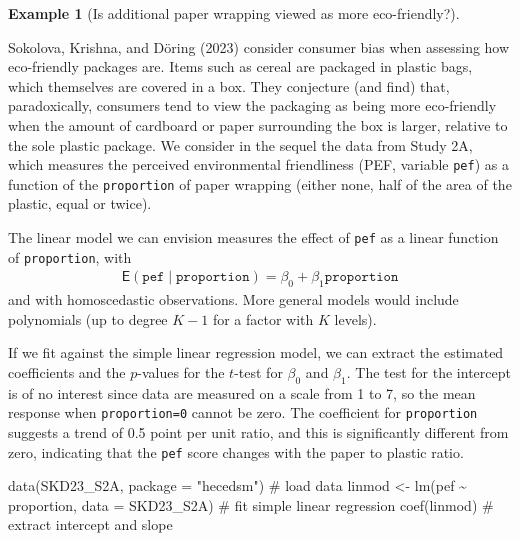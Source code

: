 \documentclass[
  11pt,
  letterpaper,
]{scrbook}
\newenvironment{Shaded}{\begin{snugshade}}{\end{snugshade}}
\newcommand{\AttributeTok}[1]{\textcolor[rgb]{0.40,0.45,0.13}{#1}}
\newcommand{\CommentTok}[1]{\textcolor[rgb]{0.37,0.37,0.37}{#1}}
\newcommand{\FunctionTok}[1]{\textcolor[rgb]{0.28,0.35,0.67}{#1}}
\newcommand{\NormalTok}[1]{\textcolor[rgb]{0.00,0.23,0.31}{#1}}
\newcommand{\OtherTok}[1]{\textcolor[rgb]{0.00,0.23,0.31}{#1}}
\newcommand{\SpecialCharTok}[1]{\textcolor[rgb]{0.37,0.37,0.37}{#1}}
\newcommand{\StringTok}[1]{\textcolor[rgb]{0.13,0.47,0.30}{#1}}
\theoremstyle{definition}
\newtheorem{example}{Example}[chapter]
\theoremstyle{definition}
\theoremstyle{remark}
\begin{document}
\begin{example}[Is additional paper wrapping viewed as more
eco-friendly?]\protect\hypertarget{exm-sokolova}{}\label{exm-sokolova}

Sokolova, Krishna, and Döring (2023) consider consumer bias when
assessing how eco-friendly packages are. Items such as cereal are
packaged in plastic bags, which themselves are covered in a box. They
conjecture (and find) that, paradoxically, consumers tend to view the
packaging as being more eco-friendly when the amount of cardboard or
paper surrounding the box is larger, relative to the sole plastic
package. We consider in the sequel the data from Study 2A, which
measures the perceived environmental friendliness (PEF, variable
\texttt{pef}) as a function of the \texttt{proportion} of paper wrapping
(either none, half of the area of the plastic, equal or twice).

The linear model we can envision measures the effect of \texttt{pef} as
a linear function of \texttt{proportion}, with \begin{align*}
\mathsf{E}(\texttt{pef} \mid \texttt{proportion}) = \beta_0 + \beta_1 \texttt{proportion}
\end{align*} and with homoscedastic observations. More general models
would include polynomials (up to degree \(K-1\) for a factor with \(K\)
levels).

If we fit against the simple linear regression model, we can extract the
estimated coefficients and the \(p\)-values for the \(t\)-test for
\(\beta_0\) and \(\beta_1\). The test for the intercept is of no
interest since data are measured on a scale from 1 to 7, so the mean
response when \texttt{proportion=0} cannot be zero. The coefficient for
\texttt{proportion} suggests a trend of 0.5 point per unit ratio, and
this is significantly different from zero, indicating that the
\texttt{pef} score changes with the paper to plastic ratio.

\begin{Shaded}
\begin{Highlighting}[]
\FunctionTok{data}\NormalTok{(SKD23\_S2A, }\AttributeTok{package =} \StringTok{"hecedsm"}\NormalTok{) }\CommentTok{\# load data}
\NormalTok{linmod }\OtherTok{\textless{}{-}} \FunctionTok{lm}\NormalTok{(pef }\SpecialCharTok{\textasciitilde{}}\NormalTok{ proportion, }\AttributeTok{data =}\NormalTok{ SKD23\_S2A)}
\CommentTok{\# fit simple linear regression}
\FunctionTok{coef}\NormalTok{(linmod) }\CommentTok{\# extract intercept and slope}
\end{Highlighting}
\end{Shaded}


\end{example}
\end{document}
